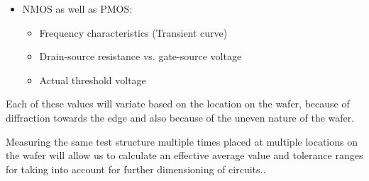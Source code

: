 \begin{itemize}
	\item NMOS as well as PMOS:
	\begin{itemize}
		\item Frequency characteristics (Transient curve)
		\item Drain-source resistance vs. gate-source voltage
		\item Actual threshold voltage
	\end{itemize}
\end{itemize}

Each of these values will variate based on the location on the wafer, because of diffraction towards the edge and also because of the uneven nature of the wafer.

Measuring the same test structure multiple times placed at multiple locations on the wafer will allow us to calculate an effective average value and tolerance ranges for taking into account for further dimensioning of circuits..
